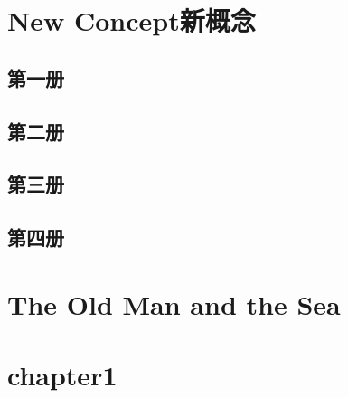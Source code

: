 \documentclass[12pt,twiside,a4paper]{ctexbook}
\numberwithin{chapter}{part}
\begin{document}
\section{New Concept新概念}
\subsection{第一册}
\subsection{第二册}
\subsection{第三册}
\subsection{第四册}
\section{The Old Man and the Sea}
\section{chapter1}

\clearpage
\end{document}
